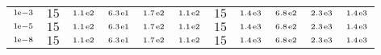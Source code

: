 \begin{tiny}
\begin{tabular}{@{$\;$}c@{$\;$}|@{$\;$}c@{$\;$}@{$\;$}c@{$\;$}@{$\;$}c@{$\;$}@{$\;$}c@{$\;$}@{$\;$}c@{$\;$}|@{$\;$}c@{$\;$}@{$\;$}c@{$\;$}@{$\;$}c@{$\;$}@{$\;$}c@{$\;$}@{$\;$}c@{$\;$}}
$\scriptstyle1\!\mathrm{\hspace{0.10em}e}-3$ & $\scriptstyle15$ & $\scriptstyle1.1\mathrm{\hspace{0.10em}e}2$ & $\scriptstyle6.3\mathrm{\hspace{0.10em}e}1$ & $\scriptstyle1.7\mathrm{\hspace{0.10em}e}2$ & $\scriptstyle1.1\mathrm{\hspace{0.10em}e}2$ & $\scriptstyle15$ & $\scriptstyle1.4\mathrm{\hspace{0.10em}e}3$ & $\scriptstyle6.8\mathrm{\hspace{0.10em}e}2$ & $\scriptstyle2.3\mathrm{\hspace{0.10em}e}3$ & $\scriptstyle1.4\mathrm{\hspace{0.10em}e}3$\\ 
$\scriptstyle1\!\mathrm{\hspace{0.10em}e}-5$ & $\scriptstyle15$ & $\scriptstyle1.1\mathrm{\hspace{0.10em}e}2$ & $\scriptstyle6.3\mathrm{\hspace{0.10em}e}1$ & $\scriptstyle1.7\mathrm{\hspace{0.10em}e}2$ & $\scriptstyle1.1\mathrm{\hspace{0.10em}e}2$ & $\scriptstyle15$ & $\scriptstyle1.4\mathrm{\hspace{0.10em}e}3$ & $\scriptstyle6.8\mathrm{\hspace{0.10em}e}2$ & $\scriptstyle2.3\mathrm{\hspace{0.10em}e}3$ & $\scriptstyle1.4\mathrm{\hspace{0.10em}e}3$\\ 
$\scriptstyle1\!\mathrm{\hspace{0.10em}e}-8$ & $\scriptstyle15$ & $\scriptstyle1.1\mathrm{\hspace{0.10em}e}2$ & $\scriptstyle6.3\mathrm{\hspace{0.10em}e}1$ & $\scriptstyle1.7\mathrm{\hspace{0.10em}e}2$ & $\scriptstyle1.1\mathrm{\hspace{0.10em}e}2$ & $\scriptstyle15$ & $\scriptstyle1.4\mathrm{\hspace{0.10em}e}3$ & $\scriptstyle6.8\mathrm{\hspace{0.10em}e}2$ & $\scriptstyle2.3\mathrm{\hspace{0.10em}e}3$ & $\scriptstyle1.4\mathrm{\hspace{0.10em}e}3$\\ 
\end{tabular} 
\end{tiny} 
